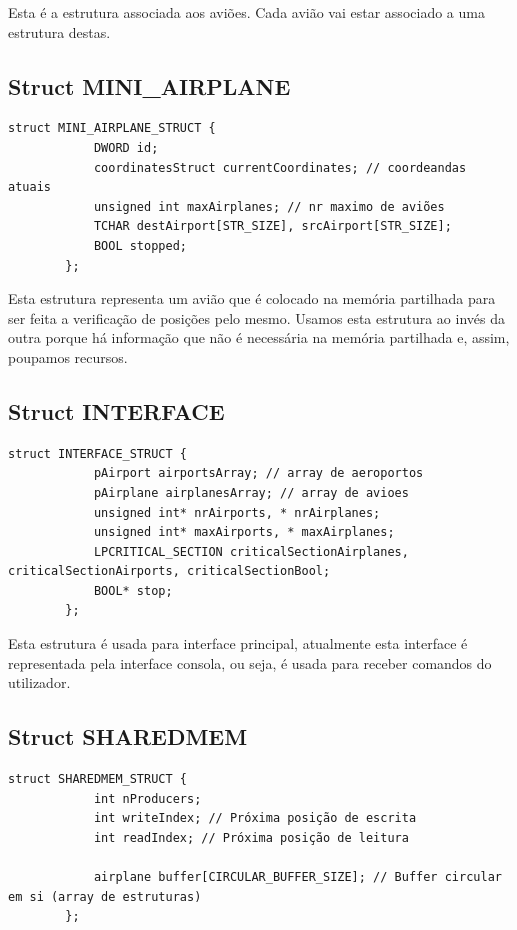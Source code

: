 \documentclass[11pt]{article}
\begin{document}
	Esta é a estrutura associada aos aviões. Cada avião vai estar associado a uma estrutura destas.
	
	
	\large
	\subsection{Struct MINI\_AIRPLANE}
	\normalsize
	
	\begin{lstlisting}[caption=Struct MINI\_AIRPLANE]
		struct MINI_AIRPLANE_STRUCT {
			DWORD id;
	        coordinatesStruct currentCoordinates; // coordeandas atuais
	        unsigned int maxAirplanes; // nr maximo de aviões
	        TCHAR destAirport[STR_SIZE], srcAirport[STR_SIZE];
	        BOOL stopped;
		};
	\end{lstlisting}
	
	Esta estrutura representa um avião que é colocado na memória partilhada para ser feita a verificação de posições pelo mesmo. Usamos esta estrutura ao invés da outra porque há informação que não é necessária na memória partilhada e, assim, poupamos recursos.
	
	
	\large
	\subsection{Struct INTERFACE}
	\normalsize
	
	\begin{lstlisting}[caption=Struct INTERFACE]
        struct INTERFACE_STRUCT {
        	pAirport airportsArray; // array de aeroportos
        	pAirplane airplanesArray; // array de avioes
        	unsigned int* nrAirports, * nrAirplanes;
        	unsigned int* maxAirports, * maxAirplanes;
        	LPCRITICAL_SECTION criticalSectionAirplanes, criticalSectionAirports, criticalSectionBool;
        	BOOL* stop;
        };
	\end{lstlisting}
	
	Esta estrutura é usada para interface principal, atualmente esta interface é representada pela interface consola, ou seja, é usada para receber comandos do utilizador.
	
	
	\large
	\subsection{Struct SHAREDMEM}
	\normalsize
	
	\begin{lstlisting}[caption=Struct SHAREDMEM\_STRUCT]
        struct SHAREDMEM_STRUCT {
        	int nProducers;
        	int writeIndex; // Próxima posição de escrita
        	int readIndex; // Próxima posição de leitura
        
        	airplane buffer[CIRCULAR_BUFFER_SIZE]; // Buffer circular em si (array de estruturas)
        };
	\end{lstlisting}
	
\end{document}

